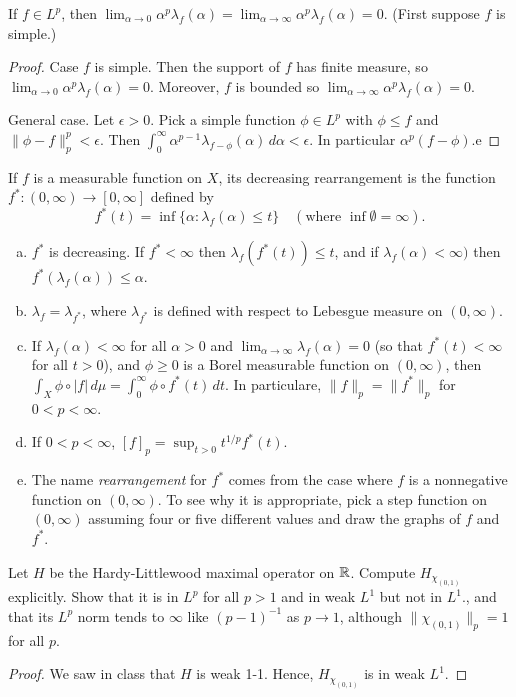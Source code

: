 \documentclass{article}
\begin{document}
 If $f \in L^p$, then $\lim_{\alpha \to 0} \alpha^p \lambda_f(\alpha) = \lim_{\alpha \to \infty} \alpha^p \lambda_f(\alpha) = 0$. (First suppose $f$ is simple.)
\begin{proof}
Case $f$ is simple.  Then the support of $f$ has finite measure, so $\lim_{\alpha \to 0} \alpha^p \lambda_f(\alpha) = 0$.  Moreover, $f$ is bounded so $\lim_{\alpha \to \infty} \alpha^p \lambda_f(\alpha) = 0$.

General case. Let $\epsilon > 0$. Pick a simple function $\phi \in L^p$ with  $\phi \le f$ and $\|\phi - f\|_p^p < \epsilon$.  Then $\int_0^\infty \alpha^{p-1} \lambda_{f - \phi}(\alpha) \, d \alpha < \epsilon$. In particular $\alpha^p (f - \phi)$.e

\end{proof}

 If $f$ is a measurable function on $X$, its decreasing rearrangement is the function $f^*: (0,\infty) \to [0,\infty]$ defined by 
$$f^*(t) = \inf\{\alpha : \lambda_f(\alpha) \le t\} \quad (\text{where } \inf \emptyset = \infty).$$
\begin{enumerate}[a.]
\item $f^*$ is decreasing. If $f^* < \infty$ then $\lambda_f(f^*(t)) \le t$, and if $\lambda_f(\alpha) < \infty)$ then $f^*(\lambda_f(\alpha)) \le \alpha$.
\item $\lambda_f = \lambda_{f^*}$, where $\lambda_{f^*}$ is defined with respect to Lebesgue measure on $(0,\infty)$.
\item If $\lambda_f(\alpha) < \infty$ for all $\alpha > 0$ and $\lim_{\alpha \to \infty} \lambda_f(\alpha) = 0$ (so that $f^*(t) < \infty$ for all $t > 0$), and 
$\phi \ge 0$ is a Borel measurable function on $(0,\infty)$, then $\int_X \phi \circ |f| \, d\mu = \int_0^\infty \phi \circ f^*(t) \, dt$. In particulare,
$\|f\|_p = \|f^*\|_p$ for $0 < p < \infty$.
\item If $0<p < \infty$, $[f]_p = \sup_{t > 0} t^{1/p} f^*(t)$.
\item The name \emph{rearrangement} for $f^*$ comes from the case where $f$ is a nonnegative function on $(0,\infty)$. To see why it is appropriate, pick
a step function on $(0, \infty)$ assuming four or five different values and draw the graphs of $f$ and $f^*$.
\end{enumerate}

 Let $H$ be the Hardy-Littlewood maximal operator on $\mathbb{R}$. Compute $H_{\chi_{(0,1)}}$ explicitly. 
Show that it is in $L^p$ for all $p > 1$ and in weak $L^1$ but not in $L^1$., and that its $L^p$ norm tends to $\infty$ 
like $(p-1)^{-1}$ as $p \to 1$, although $\|\chi_{(0,1)}\|_p = 1$ for all $p$.
\begin{proof}

We saw in class that $H$ is weak 1-1. Hence, $H_{\chi_{(0,1)}}$ is in weak $L^1$.






\end{proof}
\end{document}
